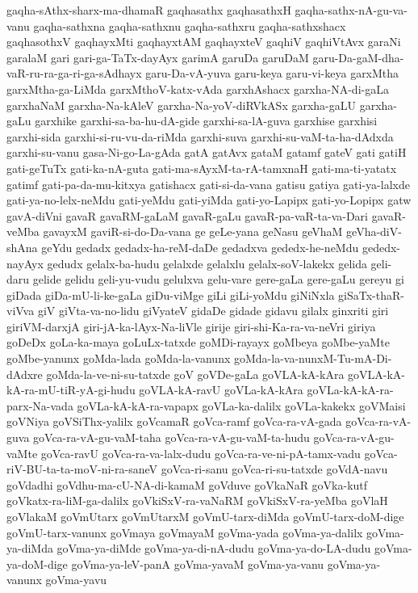 {gaqha-sAthx-sharx-ma-dhamaR
gaqhasathx
gaqhasathxH
gaqha-sathx-nA-gu-va-vanu
gaqha-sathxna
gaqha-sathxnu
gaqha-sathxru
gaqha-sathxshacx
gaqhasothxV
gaqhayxMti
gaqhayxtAM
gaqhayxteV
gaqhiV
gaqhiVtAvx
garaNi
garalaM
gari
gari-ga-TaTx-dayAyx
garimA
garuDa
garuDaM
garu-Da-gaM-dha-vaR-ru-ra-ga-ri-ga-sAdhayx
garu-Da-vA-yuva
garu-keya
garu-vi-keya
garxMtha
garxMtha-ga-LiMda
garxMthoV-katx-vAda
garxhAshacx
garxha-NA-di-gaLa
garxhaNaM
garxha-Na-kAleV
garxha-Na-yoV-diRVkASx
garxha-gaLU
garxha-gaLu
garxhike
garxhi-sa-ba-hu-dA-gide
garxhi-sa-lA-guva
garxhise
garxhisi
garxhi-sida
garxhi-si-ru-vu-da-riMda
garxhi-suva
garxhi-su-vaM-ta-ha-dAdxda
garxhi-su-vanu
gasa-Ni-go-La-gAda
gatA
gatAvx
gataM
gatamf
gateV
gati
gatiH
gati-geTuTx
gati-ka-nA-guta
gati-ma-sAyxM-ta-rA-tamxnaH
gati-ma-ti-yatatx
gatimf
gati-pa-da-mu-kitxya
gatishacx
gati-si-da-vana
gatisu
gatiya
gati-ya-lalxde
gati-ya-no-lelx-neMdu
gati-yeMdu
gati-yiMda
gati-yo-Lapipx
gati-yo-Lopipx
gatw
gavA-diVni
gavaR
gavaRM-gaLaM
gavaR-gaLu
gavaR-pa-vaR-ta-va-Dari
gavaR-veMba
gavayxM
gaviR-si-do-Da-vana
ge
geLe-yana
geNasu
geVhaM
geVha-diV-shAna
geYdu
gedadx
gedadx-ha-reM-daDe
gedadxva
gededx-he-neMdu
gededx-nayAyx
gedudx
gelalx-ba-hudu
gelalxde
gelalxlu
gelalx-soV-lakekx
gelida
geli-daru
gelide
gelidu
geli-yu-vudu
gelulxva
gelu-vare
gere-gaLa
gere-gaLu
gereyu
gi
giDada
giDa-mU-li-ke-gaLa
giDu-viMge
giLi
giLi-yoMdu
giNiNxla
giSaTx-thaR-viVva
giV
giVta-va-no-lidu
giVyateV
gidaDe
gidade
gidavu
gilalx
ginxriti
giri
giriVM-darxjA
giri-jA-ka-lAyx-Na-liVle
girije
giri-shi-Ka-ra-va-neVri
giriya
goDeDx
goLa-ka-maya
goLuLx-tatxde
goMDi-rayayx
goMbeya
goMbe-yaMte
goMbe-yanunx
goMda-lada
goMda-la-vanunx
goMda-la-va-nunxM-Tu-mA-Di-dAdxre
goMda-la-ve-ni-su-tatxde
goV
goVDe-gaLa
goVLA-kA-kAra
goVLA-kA-kA-ra-mU-tiR-yA-gi-hudu
goVLA-kA-ravU
goVLa-kA-kAra
goVLa-kA-kA-ra-parx-Na-vada
goVLa-kA-kA-ra-vapapx
goVLa-ka-dalilx
goVLa-kakekx
goVMaisi
goVNiya
goVSiThx-yalilx
goVcamaR
goVca-ramf
goVca-ra-vA-gada
goVca-ra-vA-guva
goVca-ra-vA-gu-vaM-taha
goVca-ra-vA-gu-vaM-ta-hudu
goVca-ra-vA-gu-vaMte
goVca-ravU
goVca-ra-va-lalx-dudu
goVca-ra-ve-ni-pA-tamx-vadu
goVca-riV-BU-ta-ta-moV-ni-ra-saneV
goVca-ri-sanu
goVca-ri-su-tatxde
goVdA-navu
goVdadhi
goVdhu-ma-cU-NA-di-kamaM
goVduve
goVkaNaR
goVka-kutf
goVkatx-ra-liM-ga-dalilx
goVkiSxV-ra-vaNaRM
goVkiSxV-ra-yeMba
goVlaH
goVlakaM
goVmUtarx
goVmUtarxM
goVmU-tarx-diMda
goVmU-tarx-doM-dige
goVmU-tarx-vanunx
goVmaya
goVmayaM
goVma-yada
goVma-ya-dalilx
goVma-ya-diMda
goVma-ya-diMde
goVma-ya-di-nA-dudu
goVma-ya-do-LA-dudu
goVma-ya-doM-dige
goVma-ya-leV-panA
goVma-yavaM
goVma-ya-vanu
goVma-ya-vanunx
goVma-yavu
}
